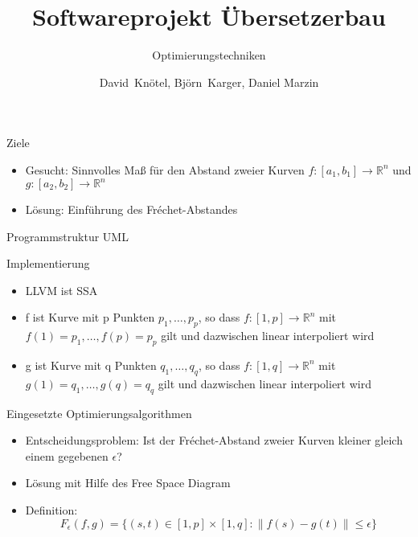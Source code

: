 \documentclass[ucs,9pt]{beamer}
\title[Softwareprojekt Übersetzerbau]
{Softwareprojekt Übersetzerbau}
\subtitle{Optimierungstechniken}
\author[Knötel, Karger, Marzin] %
{David~Knötel, Björn~Karger, Daniel Marzin}
\institute[FU Berlin] %
{Freie Universität Berlin, Institut für Informatik}
\date[20.07.2012] %
{}
\begin{document}
\frame[plain]{\titlepage}



\begin{frame}{Ziele}

\begin{itemize}
\item Gesucht: Sinnvolles Maß für den Abstand zweier Kurven $f:[a_1,b_1]\rightarrow \mathds{R}^n$ und $g:[a_2,b_2]\rightarrow \mathds{R}^n$
\vspace{3mm}
\item Lösung: Einführung des Fréchet-Abstandes
\end{itemize}
\end{frame}

\begin{frame}{Programmstruktur}
UML
\end{frame}

\begin{frame}{Implementierung}
\begin{itemize}
\item LLVM ist SSA
\vspace{3mm}
\item f ist Kurve mit p Punkten $p_1,\dots ,p_p$, so dass $f:[1,p]\rightarrow \mathds{R}^n$ mit $f(1) = p_1,\dots ,f(p) = p_p$ gilt und dazwischen linear interpoliert wird
\vspace{3mm}
\item g ist Kurve mit q Punkten $q_1,\dots ,q_q$, so dass $f:[1,q]\rightarrow \mathds{R}^n$ mit $g(1) = q_1,\dots ,g(q) = q_q$ gilt und dazwischen linear interpoliert wird
\end{itemize}
\end{frame}

\begin{frame}{Eingesetzte Optimierungsalgorithmen}
\begin{itemize}
\item Entscheidungsproblem: Ist der Fréchet-Abstand zweier Kurven kleiner gleich einem gegebenen $\epsilon$?
\vspace{3mm}
\item Lösung mit Hilfe des Free Space Diagram
\vspace{3mm}
\item Definition: $$F_\epsilon (f,g) = \{(s,t)\in [1,p] \times [1,q] : \|f(s) - g(t)\| \leq \epsilon \}$$
\end{itemize}
\end{frame}
\end{document}
